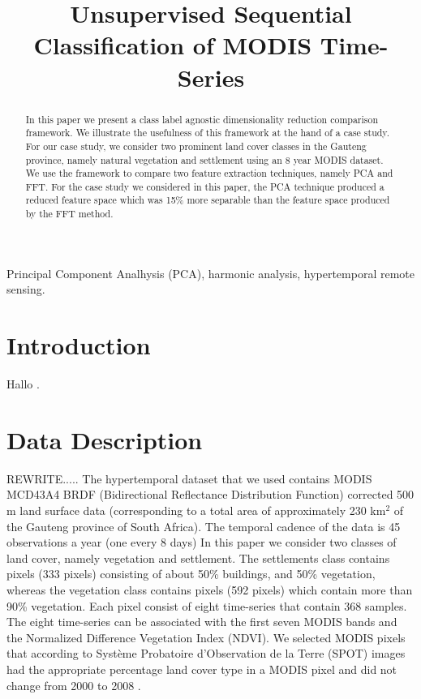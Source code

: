 \documentclass{article}
\title{Unsupervised Sequential Classification of MODIS Time-Series}
\begin{document}
%
\maketitle
%
\begin{abstract}
In this paper we present a class label agnostic dimensionality reduction comparison framework. 
We illustrate the usefulness of this framework at the hand of a case study. For our case study, we consider two prominent land cover classes in the Gauteng province, namely natural vegetation and settlement using an 8 year MODIS dataset. We use the framework to compare two 
feature extraction techniques, namely PCA and FFT. For the case study we considered in this paper, the PCA technique produced a reduced feature space which was 15\% more 
separable than the feature space produced by the FFT method.
\end{abstract}
%
\begin{keywords}
Principal Component Analhysis (PCA), harmonic analysis, hypertemporal remote sensing.
\end{keywords}
%

\section{Introduction}
\label{sec:intro}
Hallo \cite{almeida2015}.

\section{Data Description}
\label{sec:data}
REWRITE.....
The hypertemporal dataset that we used contains MODIS MCD43A4 BRDF (Bidirectional Reflectance Distribution Function) corrected 500 m land surface
data (corresponding to a total area of approximately 230 km$^2$ of the Gauteng province of South Africa). The temporal cadence of the data is 45 observations a year (one every 8 days) In this paper we consider two classes of land cover, namely vegetation and settlement. The settlements class contains pixels (333 pixels) consisting of about
50\% buildings, and 50\% vegetation, whereas the vegetation class contains pixels (592 pixels) which contain more than 90\% vegetation. Each pixel consist of eight time-series that contain 368 samples. The eight time-series can be associated with the first seven MODIS bands and the Normalized Difference Vegetation Index (NDVI).
We selected MODIS pixels that according to Système Probatoire d’Observation de la Terre (SPOT) images had the appropriate percentage land cover type in a MODIS pixel and did not change from 2000 to 2008 \cite{grobler2012}.
\end{document}

